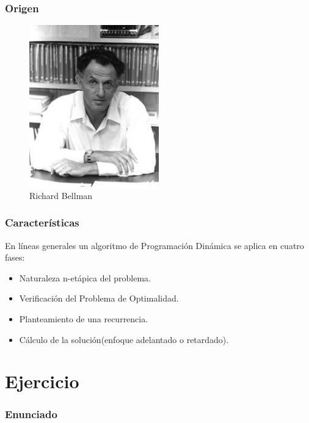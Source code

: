 \documentclass[13pt]{beamer}
\begin{document}
    \begin{frame}
		\frametitle{Origen}
            \begin{figure}[H] 
                \centering
                \includegraphics[width=0.5\textwidth]{bellman.jpg}
                \caption{Richard Bellman}
            \end{figure}
    \end{frame}

	\begin{frame}
		\frametitle{Características}
        En líneas generales un algoritmo de Programación Dinámica se aplica en cuatro fases:
        \begin{itemize}
        \item Naturaleza n-etápica del problema.
        \item Verificación del Problema de Optimalidad.
        \item Planteamiento de una recurrencia.
        \item Cálculo de la solución(enfoque adelantado o retardado). 
        \end{itemize}
	\end{frame}

	\section{Ejercicio}

    \begin{frame}
        \frametitle{Enunciado}
        
    \end{frame}
\end{document}
